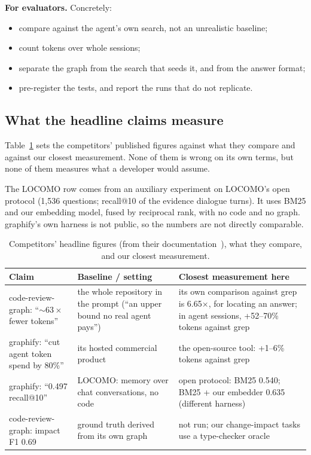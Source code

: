 \documentclass[sigconf,nonacm]{acmart}
\newcommand{\gfy}{graphify\xspace}
\newcommand{\crg}{code-review-graph\xspace}
\begin{document}
\textbf{For evaluators.} Concretely:
\begin{itemize}
\item compare against the agent's own search, not an unrealistic baseline;
\item count tokens over whole sessions;
\item separate the graph from the search that seeds it, and from the answer format;
\item pre-register the tests, and report the runs that do not replicate.
\end{itemize}

\subsection{What the headline claims measure}
\label{sec:claims}
Table~\ref{tab:claims} sets the competitors' published figures against what they compare and against our closest measurement. None of them is wrong on its own terms, but none of them measures what a developer would assume.

The LOCOMO row comes from an auxiliary experiment on LOCOMO's open protocol (1,536 questions; recall@10 of the evidence dialogue turns). It uses BM25 and our embedding model, fused by reciprocal rank, with no code and no graph. graphify's own harness is not public, so the numbers are not directly comparable.

\begin{table}[t]
\caption{Competitors' headline figures (from their documentation~\cite{graphify,crg}), what they compare, and our closest measurement.}
\label{tab:claims}
\small
\begin{tabular}{@{}>{\raggedright\arraybackslash}p{}>{\raggedright\arraybackslash}p{}>{\raggedright\arraybackslash}p{}@{}}
\toprule
Claim & Baseline / setting & Closest measurement here \\
\midrule
\crg: ``${\sim}63\times$ fewer tokens'' & the whole repository in the prompt (``an upper bound no real agent pays'') & its own comparison against grep is 6.65$\times$, for locating an answer; in agent sessions, +52--70\% tokens against grep \\
\gfy: ``cut agent token spend by 80\%'' & its hosted commercial product & the open-source tool: +1--6\% tokens against grep \\
\gfy: ``0.497 recall@10'' & LOCOMO: memory over chat conversations, no code & open protocol: BM25 0.540; BM25 + our embedder 0.635 (different harness) \\
\crg: impact F1 0.69 & ground truth derived from its own graph & not run; our change-impact tasks use a type-checker oracle \\
\bottomrule
\end{tabular}
\end{table}
\end{document}
